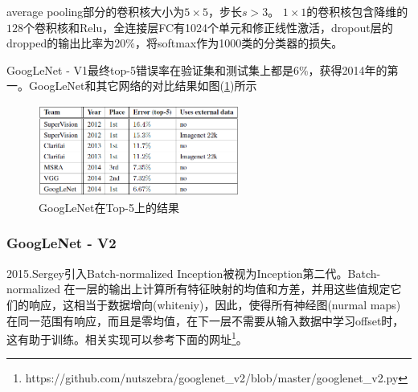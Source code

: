             average pooling部分的卷积核大小为$5\times 5$，步长$s >3$。
            $1\times 1$的卷积核包含降维的$128$个卷积核和Relu，全连接层FC有1024个单元和修正线性激活，dropout层的dropped的输出比率为$20\%$，将softmax作为1000类的分类器的损失。
            \par
            GoogLeNet - V1最终top-5错误率在验证集和测试集上都是$6\%$，获得2014年的第一。GoogLeNet和其它网络的对比结果如图(\ref{fig:GoogLeNet在Top-5上的结果})所示
             \begin{figure}[H]
            \centering
            \includegraphics[height=3cm]{images/The_result_of_GoogLeNet_in_top5.jpg}
            \caption{GoogLeNet在Top-5上的结果}
            \label{fig:GoogLeNet在Top-5上的结果}
            \end{figure}

        \subsubsection{GoogLeNet - V2}
            \par
            2015.Sergey\cite{2015.Sergey}引入Batch-normalized Inception被视为Inception第二代。Batch-normalized 在一层的输出上计算所有特征映射的均值和方差，并用这些值规定它们的响应，这相当于数据增向(whiteniy)，因此，使得所有神经图(nurmal maps)在同一范围有响应，而且是零均值，在下一层不需要从输入数据中学习offset时，这有助于训练。相关实现可以参考下面的网址\footnote{https://github.com/nutszebra/googlenet\_v2/blob/master/googlenet\_v2.py}。

